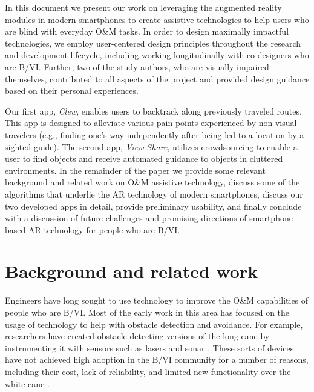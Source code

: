 \documentclass[chi_draft]{sigchi}
\newcommand{\BVI}{B/VI\xspace}
\newcommand{\OM}{O\&M\xspace}
\begin{document}
In this document we present our work on leveraging the augmented reality modules in modern smartphones to create assistive technologies to help users who are blind with everyday \OM tasks.  In order to design maximally impactful technologies, we employ user-centered design principles throughout the research and development lifecycle, including working longitudinally with co-designers who are \BVI.  Further, two of the study authors, who are visually impaired themselves, contributed to all aspects of the project and provided design guidance based on their personal experiences.

Our first app, \emph{Clew}, enables users to backtrack along previously traveled routes.  This app is designed to alleviate various pain points experienced by non-visual travelers (e.g., finding one's way independently after being led to a location by a sighted guide).  The second app, \emph{View Share}, utilizes crowdsourcing to enable a user to find objects and receive automated guidance to objects in cluttered environments.  In the remainder of the paper we provide some relevant background and related work on \OM assistive technology, discuss some of the algorithms that underlie the AR technology of modern smartphones, discuss our two developed apps in detail, provide preliminary usability, and finally conclude with a discussion of future challenges and promising directions of smartphone-based AR technology for people who are \BVI.   

\section{Background and related work}
Engineers have long sought to use technology to improve the \OM capabilities of people who are \BVI.  Most of the early work in this area has focused on the usage of technology to help with obstacle detection and avoidance.  For example, researchers have created obstacle-detecting versions of the long cane by instrumenting it with sensors such as lasers \cite{benjamin1973new} and sonar \cite{borenstein1997guidecane}.  These sorts of devices have not achieved high adoption in the \BVI community for a number of reasons, including their cost, lack of reliability, and limited new functionality over the white cane \cite{wiener2010foundations}.
\end{document}
